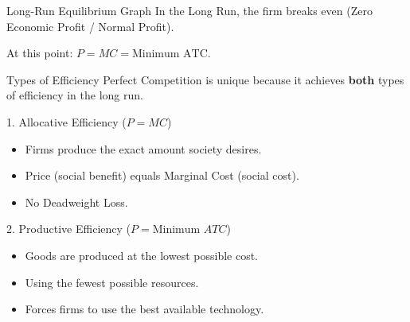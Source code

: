 \documentclass[aspectratio=169, 10pt]{beamer}
\begin{document}
\begin{frame}{Long-Run Equilibrium Graph}
    In the Long Run, the firm breaks even (Zero Economic Profit / Normal Profit).
    
    \begin{center}
    \end{center}
    At this point: $P = MC = \text{Minimum ATC}$.
\end{frame}

\begin{frame}{Types of Efficiency}
    Perfect Competition is unique because it achieves \textbf{both} types of efficiency in the long run.
    \vspace{0.5cm}
    
    \begin{block}{1. Allocative Efficiency ($P = MC$)}
        \begin{itemize}
            \item Firms produce the exact amount society desires.
            \item Price (social benefit) equals Marginal Cost (social cost).
            \item No Deadweight Loss.
        \end{itemize}
    \end{block}

    \begin{block}{2. Productive Efficiency ($P = \text{Minimum } ATC$)}
        \begin{itemize}
            \item Goods are produced at the lowest possible cost.
            \item Using the fewest possible resources.
            \item Forces firms to use the best available technology.
        \end{itemize}
    \end{block}
\end{frame}
\end{document}
